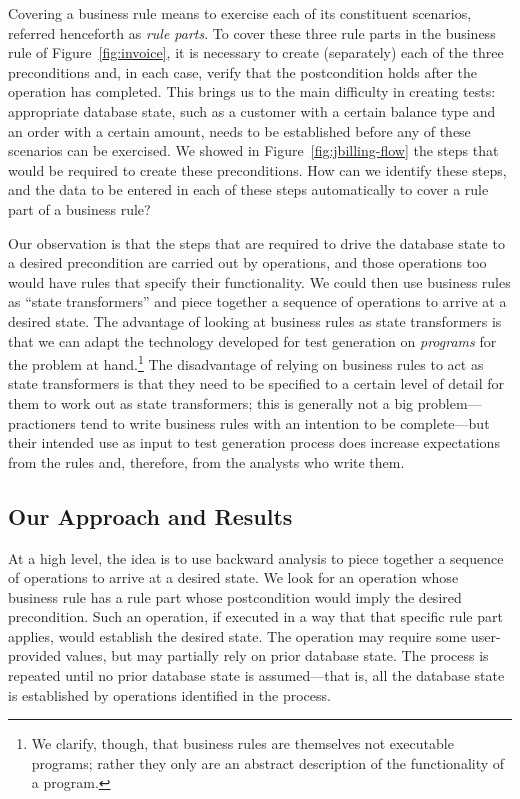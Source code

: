 Covering a business rule means to exercise each of its constituent scenarios,
referred henceforth as \textit{rule parts}.  To cover these three rule parts in
the business rule of Figure~\ref{fig:invoice}, it is necessary to create
(separately) each of the three preconditions and, in each case, verify that the
postcondition holds after the operation has completed.  This brings us to the
main difficulty in creating tests: appropriate database state, such as a
customer with a certain balance type and an order with a certain amount, needs
to be established before any of these scenarios can be exercised.  We showed in
Figure~\ref{fig:jbilling-flow} the steps that would be required to create these
preconditions.  How can we identify these steps, and the data to be entered in
each of these steps automatically to cover a rule part of a business rule?

Our observation is that the steps that are required to drive the database state
to a desired precondition are carried out by operations, and those operations
too would have rules that specify their functionality.  We could then use
business rules as ``state transformers'' and piece together a sequence of
operations to arrive at a desired state.  The advantage of looking at business
rules as state transformers is that we can adapt the technology developed for
test generation on \textit{programs} for the problem at hand.\footnote{We
  clarify, though, that business rules are themselves not executable programs;
  rather they only are an abstract description of the functionality of a
  program.}  The disadvantage of relying on business rules to act as state
transformers is that they need to be specified to a certain level of detail for
them to work out as state transformers; this is generally not a big
problem---practioners tend to write business rules with an intention to be
complete---but their intended use as input to test generation process does
increase expectations from the rules and, therefore, from the analysts who write
them.

\subsection{Our Approach and Results}

At a high level, the idea is to use backward analysis to piece together a
sequence of operations to arrive at a desired state.  We look for an operation
whose business rule has a rule part whose postcondition would imply the desired
precondition.  Such an operation, if executed in a way that that specific rule
part applies, would establish the desired state.  The operation may require some
user-provided values, but may partially rely on prior database state. The
process is repeated until no prior database state is assumed---that is, all the
database state is established by operations identified in the process.

